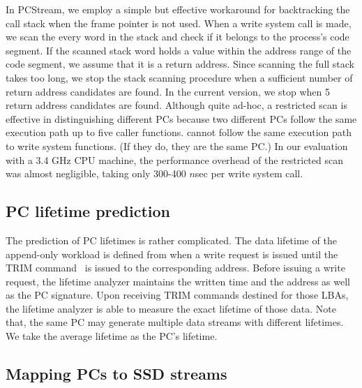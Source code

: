 In \textsf{\small PCStream}, we employ a simple but effective workaround 
for backtracking the call stack when the frame pointer is not used.
When a write system call is made, we scan the every word in the stack and check
if it belongs to the process's code segment.  If the scanned stack word holds a
value within the address range of the code segment, we assume that it is a
return address.  Since scanning the full stack takes too long, we stop the
stack scanning procedure when a sufficient number of return address candidates
are found.  In the current version, we stop when 5 return address candidates
are found.  Although quite ad-hoc, a restricted scan is effective in
distinguishing different PCs because two different PCs
follow the same execution path up to five caller functions.   
cannot follow the same execution path to write system functions.  
(If they do, they are the same PC.) In our evaluation
with a 3.4 GHz CPU machine, the performance overhead of the restricted scan was
almost negligible, taking only 300-400 $n$sec per write system call.



\subsection{PC lifetime prediction}
\vspace{-3pt}

The prediction of PC lifetimes is rather complicated. 
The data lifetime of the append-only workload is defined 
from when a write request is issued until the TRIM command~\cite{TRIM} is issued to 
the corresponding address.
Before issuing a write request, the lifetime analyzer
maintains the written time and the address as well as the PC signature.
Upon receiving TRIM
commands destined for those LBAs, the lifetime analyzer is able to measure the
exact lifetime of those data. 
Note that, the
same PC may generate multiple data streams with different lifetimes.
We take the average lifetime as the PC's lifetime.

\vspace{-10pt}
\subsection{Mapping PCs to SSD streams}
\vspace{-3pt}

